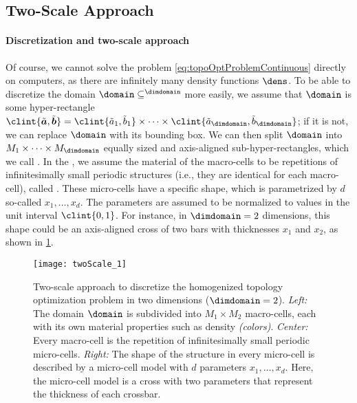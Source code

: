 \subsection{Two-Scale Approach}
\label{sec:612twoScale}

\paragraph{Discretization and two-scale approach}

Of course, we cannot solve the problem \eqref{eq:topoOptProblemContinuous}
directly on computers,
as there are infinitely many density functions $\dens$.
To be able to discretize the domain $\domain \subset \real^{\dimdomain}$
more easily, we assume that $\domain$ is some hyper-rectangle
$\clint{\tilde{\*a}, \tilde{\*b}}
= \clint{\tilde{a}_1, \tilde{b}_1} \times \dotsb \times
\clint{\tilde{a}_{\dimdomain}, \tilde{b}_{\dimdomain}}$;
if it is not, we can replace $\domain$ with its bounding box.
We can then split $\domain$ into $M_1 \times \dotsb \times M_{\dimdomain}$
equally sized and axis-aligned sub-hyper-rectangles,
which we call .
In the ,
we assume the material of the macro-cells to be
repetitions of infinitesimally small periodic structures
(i.e., they are identical for each macro-cell),
called .
These micro-cells have a specific shape, which is parametrized by $d$ so-called
 $x_1, \dotsc, x_d$.
The parameters are assumed to be normalized to values in the
unit interval $\clint{0, 1}$.
For instance, in $\dimdomain = 2$ dimensions,
this shape could be an axis-aligned cross of two bars
with thicknesses $x_1$ and $x_2$, as shown in \cref{fig:twoScale}.

\begin{figure}
  \texttt{[image: twoScale\_1]}%
  \caption[%
    Two-scale approach for topology optimization%
  ]{%
    Two-scale approach to discretize the homogenized topology
    optimization problem in two dimensions ($\dimdomain = 2$).
    \emph{Left:} The domain $\domain$ is subdivided into $M_1 \times M_2$
    macro-cells, each with its own material properties such as density
    \emph{(colors)}.
    \emph{Center:} Every macro-cell is the repetition of infinitesimally small
    periodic micro-cells.
    \emph{Right:} The shape of the structure in every micro-cell is
    described by a micro-cell model with $d$ parameters $x_1, \dotsc, x_d$.
    Here, the micro-cell model is a cross with two parameters
    that represent the thickness of each crossbar.%
  }%
  \label{fig:twoScale}%
\end{figure}

